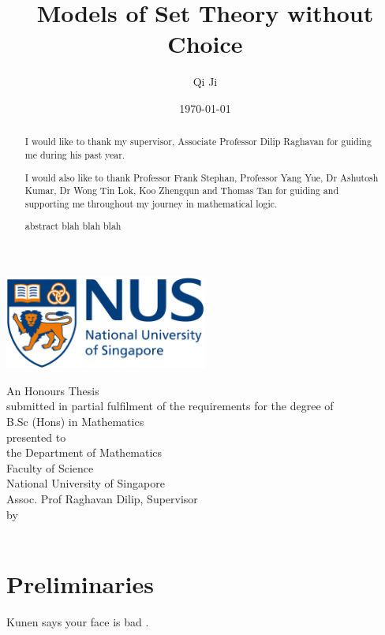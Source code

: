 \documentclass[british,a4paper,12pt,abstract=on]{scrreprt}
\title{Models of Set Theory without Choice}
\author{Qi Ji}
\date{\today}
\makeatletter
\let\thetitle\@title
\let\theauthor\@author
\let\thedate\@date
\theoremstyle{definition}
\theoremstyle{remark}
\newcommand{\makecoverpage}{
    \begin{center}
        \singlespacing
        \includegraphics[width=0.5\textwidth]{nus_logo}
        \vspace*{3em}

        \doublespacing
        {\huge \textbf{\thetitle}}
        \vspace*{5em}

        {An Honours Thesis \\ submitted in partial fulfilment of the requirements for
        the degree of \\ B.Sc (Hons) in Mathematics\\}
        \vspace*{3em}
        {presented to \\ the Department of Mathematics \\ Faculty of Science \\ National University of Singapore \\ Assoc. Prof Raghavan Dilip, Supervisor \\}
        \vspace*{3em}
        {by \\ \theauthor \\}
        \vspace*{3em}
        {\thedate}
    \end{center}
}
\newenvironment{acknowledgements}{\renewcommand\abstractname{Acknowledgements}\begin{abstract}} {\end{abstract}}
\makeatother
\begin{document}
\let\setminus\smallsetminus
\let\epsilon\varepsilon
\begin{titlepage}
    \makecoverpage
\end{titlepage}
{}
\begin{acknowledgements}
    I would like to thank my supervisor, Associate Professor Dilip Raghavan for guiding me during his past year.

    I would also like to thank Professor Frank Stephan, Professor Yang Yue, Dr Ashutosh Kumar, Dr Wong Tin Lok, Koo Zhengqun and Thomas Tan for guiding and supporting me throughout my journey in mathematical logic.
\end{acknowledgements}

{}
\begin{abstract}
    abstract blah blah blah


\end{abstract}

\tableofcontents

\chapter{Preliminaries}
Kunen says your face is bad \autocite{kunen1980}.



\printbibliography[heading=bibintoc,title={References}]
\end{document}
